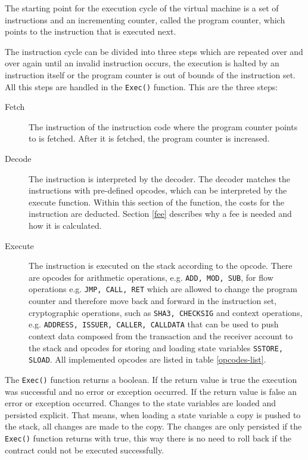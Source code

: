 The starting point for the execution cycle of the virtual machine is a set of instructions and an incrementing counter, called the program counter, which points to the instruction that is executed next.

The instruction cycle can be divided into three steps which are repeated over and over again until an invalid instruction occurs, the execution is halted by an instruction itself or the program counter is out of bounds of the instruction set. All this steps are handled in the \texttt{Exec()} function. This are the three steps:
\begin{description}
  \item[Fetch] The instruction of the instruction code where the program counter points to is fetched. After it is fetched, the program counter is increased.
  \item[Decode] The instruction is interpreted by the decoder. The decoder matches the instructions with pre-defined opcodes, which can be interpreted by the execute function. Within this section of the function, the costs for the instruction are deducted. Section \ref{fee} describes why a fee is needed and how it is calculated.
  \item[Execute] The instruction is executed on the stack according to the opcode. There are opcodes for arithmetic operations, e.g. \texttt{ADD, MOD, SUB}, for flow operations e.g. \texttt{JMP, CALL, RET} which are allowed to change the program counter and therefore move back and forward in the instruction set, cryptographic operations, such as \texttt{SHA3, CHECKSIG} and context operations, e.g. \texttt{ADDRESS, ISSUER, CALLER, CALLDATA} that can be used to push context data composed from the transaction and the receiver account to the stack and opcodes for storing and loading state variables \texttt{SSTORE, SLOAD}. All implemented opcodes are listed in table \ref{opcodes-list}.
\end{description}
The \texttt{Exec()} function returns a boolean. If the return value is true the execution was successful and no error or exception occurred. If the return value is false an error or exception occurred. Changes to the state variables are loaded and persisted explicit. That means, when loading a state variable a copy is pushed to the stack, all changes are made to the copy. The changes are only persisted if the \texttt{Exec()} function returns with true, this way there is no need to roll back if the contract could not be executed successfully.

